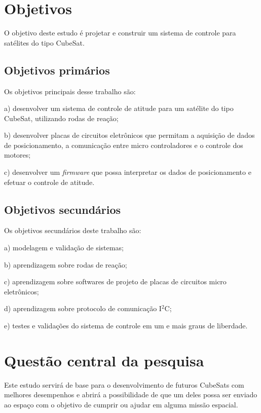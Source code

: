 \documentclass[
	12pt,				%
	openany,			%
	twoside,			%
	a4paper,			%
	english,			%
	french,				%
	spanish,			%
	brazil,				%
	oldfontcommands
	]{abntex2}
\begin{document}
\section{Objetivos}

O objetivo deste estudo é projetar e construir um sistema de controle para satélites do tipo CubeSat.

\subsection[Objetivos primários]{Objetivos primários}

Os objetivos principais desse trabalho são:

a)	desenvolver um sistema de controle de atitude para um satélite do tipo CubeSat, utilizando rodas de reação;

b)	desenvolver placas de circuitos eletrônicos que permitam a aquisição de dados de posicionamento, a comunicação entre micro controladores e o controle dos motores;

c)	desenvolver um \textit{firmware} que possa interpretar os dados de posicionamento e efetuar o controle de atitude.

\subsection[Objetivos secundários]{Objetivos secundários}

Os objetivos secundários deste trabalho são:

a)	modelagem e validação de sistemas;

b)	aprendizagem sobre rodas de reação;

c)	aprendizagem sobre softwares de projeto de placas de circuitos micro eletrônicos;

d)	aprendizagem sobre protocolo de comunicação I$^{2}$C;

e)	testes e validações do sistema de controle em um e mais graus de liberdade.

\section{Questão central da pesquisa}

Este estudo servirá de base para o desenvolvimento de futuros CubeSats com melhores desempenhos e abrirá a possibilidade de que um deles possa ser enviado ao espaço com o objetivo de cumprir ou ajudar em alguma missão espacial.
\end{document}

